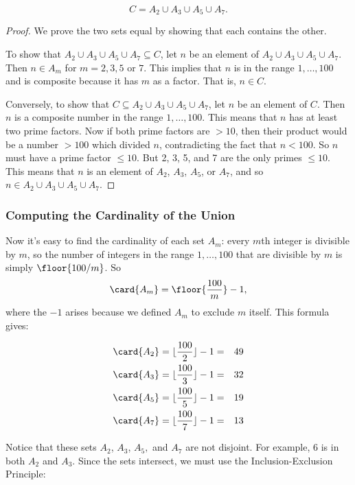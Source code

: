\begin{lemma}
\[
C = A_2 \cup A_3 \cup A_5 \cup A_7.
\]
\end{lemma}

\begin{proof}
We prove the two sets equal by showing that each contains the other.

To show that $A_2 \cup A_3 \cup A_5 \cup A_7 \subseteq C$, let $n$ be an
element of $A_2 \cup A_3 \cup A_5 \cup A_7$.  Then $n \in A_m$ for $m = 2,
3, 5$ or $7$.  This implies that $n$ is in the range $1, \dots, 100$ and
is composite because it has $m$ as a factor.  That is, $n \in C$.

Conversely, to show that $C \subseteq A_2 \cup A_3 \cup A_5 \cup A_7$, let
$n$ be an element of $C$.  Then $n$ is a composite number in the range $1,
\dots, 100$.  This means that $n$ has at least two prime factors.  Now if
both prime factors are $> 10$, then their product would be a number $>
100$ which divided $n$, contradicting the fact that $n<100$.  So $n$ must
have a prime factor $\leq 10$.  But 2, 3, 5, and 7 are the only primes
$\leq 10$.  This means that $n$ is an element of $A_2$, $A_3$, $A_5$, or
$A_7$, and so $n \in A_2 \cup A_3 \cup A_5 \cup A_7$.
\end{proof}

\subsubsection*{Computing the Cardinality of the Union}

Now it's easy to find the cardinality of each set $A_m$: every $m$th
integer is divisible by $m$, so the number of integers in the range $1,
\dots, 100$ that are divisible by $m$ is simply $\floor{100/m}$.  So
\[
\card{A_m} = \floor{\frac{100}{m}} - 1,
\]
where the $-1$ arises because we defined $A_m$ to exclude $m$ itself.
This formula gives:

\begin{eqnarray*}
\card{A_2} & = \lfloor\frac{100}{2}\rfloor - 1 = & 49 \\
\card{A_3} & = \lfloor\frac{100}{3}\rfloor - 1 = & 32 \\
\card{A_5} & = \lfloor\frac{100}{5}\rfloor - 1 = & 19 \\
\card{A_7} & = \lfloor\frac{100}{7}\rfloor - 1 = & 13
\end{eqnarray*}

Notice that these sets $A_2$, $A_3$, $A_5,$ and $A_7$ are not disjoint.
For example, 6 is in both $A_2$ and $A_3$.  Since the sets intersect, we
must use the Inclusion-Exclusion Principle:

